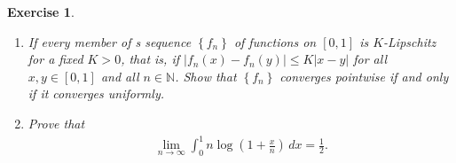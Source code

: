 \documentclass[11pt]{article}
\newtheorem{exercise}{Exercise}[section]
\theoremstyle{definition}
\numberwithin{equation}{subsection}
\begin{document}
\begin{exercise}{\rm *}
~\begin{enumerate}[label=(\alph*)]
    \item If every member of s sequence $\left\{f_n\right\}$ of functions on $[0,1]$ is $K$-Lipschitz for a fixed $K > 0$, that is, if $\left|f_n(x) - f_n(y)\right| \leq K |x - y|$ for all $x , y \in [0,1]$ and all $n \in \mathbb{N}$. Show that $\left\{f_n\right\}$ converges pointwise if and only if it converges uniformly.
    
    \item Prove that
    \begin{align*}
        \lim_{n\to\infty} \int^1_0 n \log \left(1 + \frac{x}{n}\right)\, dx = \frac{1}{2}.
    \end{align*}
\end{enumerate}
\end{exercise}
\end{document}
